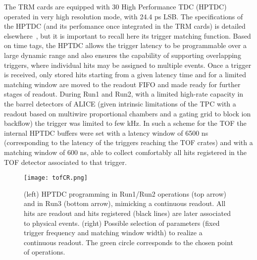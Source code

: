 The TRM cards are equipped with 30 High Performance TDC (HPTDC) operated in very high resolution mode, with 24.4 ps LSB. The specifications of the HPTDC (and its perfomance once integrated in the TRM cards) is detailed elsewhere~\cite{Akindinov:2004gf}, but it is important to recall here its trigger matching function. Based on time tags, the HPTDC allows the trigger latency to be programmable over a large dynamic range and also ensures the capability of supporting overlapping triggers, where individual hits may be assigned to multiple events. Once a trigger is received, only stored hits starting from a given latency time and for a limited matching window are moved to the readout FIFO and made ready for further stages of readout. During Run1 and Run2, with a limited high-rate capacity in the barrel detectors of ALICE (given intrinsic limitations of the TPC with a readout based on multiwire proportional chambers and a gating grid to block ion backflow) the trigger was limited to few kHz. In such a scheme for the TOF the internal HPTDC buffers were set with a latency window of 6500 ns (corresponding to the latency of the triggers reaching the TOF crates) and with a matching window of 600 ns, able to collect comfortably all hits registered in the TOF detector associated to that trigger.

\begin{figure}[b!]
\centering
\texttt{[image: tofCR.png]} 
\caption{(left) HPTDC programming in Run1/Run2 operations (top arrow) and in Run3 (bottom arrow), mimicking a continuous readout. All hits are readout and hits registered (black lines) are later associated to physical events. (right) Possible selection of parameters (fixed trigger frequency and matching window width) to realize a continuous readout. The green circle corresponds to the chosen point of operations.}
\label{fig:cro}
\end{figure}

